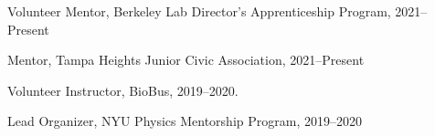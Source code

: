 \documentclass[12pt,letterpaper]{article}
\begin{document}
\begin{list}{}{\cvlist}

\item
  Volunteer Mentor, Berkeley Lab Director's Apprenticeship Program, 2021--Present

\item
  Mentor, Tampa Heights Junior Civic Association, 2021--Present

\item
  Volunteer Instructor, BioBus, 2019--2020.

\item
  Lead Organizer, NYU Physics Mentorship Program, 2019--2020

\end{list}
\end{document}
